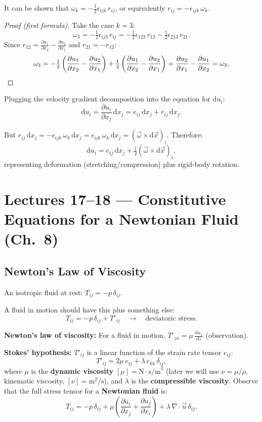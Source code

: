 \documentclass[11pt,a4paper]{article}
\newcommand{\pdx}[2]{\frac{\partial #1}{\partial #2}}
\newcommand{\xv}{\vec{x}}
\newcommand{\uv}{\vec{u}}
\newcommand{\omv}{\vec{\omega}}
\begin{document}
It can be shown that $\omega_k = -\tfrac{1}{2}\epsilon_{ijk}\,r_{ij}$, or equivalently $r_{ij} = -\epsilon_{ijk}\,\omega_k$.

\begin{proof}[Proof (first formula)]
Take the case $k = 3$:
\[
    \omega_3 = -\tfrac{1}{2}\epsilon_{ij3}\,r_{ij} = -\tfrac{1}{2}\epsilon_{123}\,r_{12} - \tfrac{1}{2}\epsilon_{213}\,r_{21}.
\]
Since $r_{12} = \pdx{u_1}{x_2} - \pdx{u_2}{x_1}$ and $r_{21} = -r_{12}$:
\[
    \omega_3 = -\tfrac{1}{2}\left(\pdx{u_1}{x_2} - \pdx{u_2}{x_1}\right) + \tfrac{1}{2}\left(\pdx{u_1}{x_2} - \pdx{u_2}{x_1}\right) = \pdx{u_2}{x_1} - \pdx{u_1}{x_2} = \omega_3. \qedhere
\]
\end{proof}

Plugging the velocity gradient decomposition into the equation for $\mathrm{d}u_i$:
\[
    \mathrm{d}u_i = \pdx{u_i}{x_j}\,\mathrm{d}x_j = e_{ij}\,\mathrm{d}x_j + r_{ij}\,\mathrm{d}x_j.
\]

But $r_{ij}\,\mathrm{d}x_j = -\epsilon_{ijk}\,\omega_k\,\mathrm{d}x_j = \epsilon_{ijk}\,\omega_k\,\mathrm{d}x_j = (\omv \times \mathrm{d}\xv)_i$. Therefore:
\[
    \boxed{\mathrm{d}u_i = e_{ij}\,\mathrm{d}x_j + \tfrac{1}{2}(\omv \times \mathrm{d}\xv)_i,}
\]
representing deformation (stretching/compression) plus rigid-body rotation.

\section{Lectures 17--18 --- Constitutive Equations for a Newtonian Fluid (Ch.\ 8)}

\subsection{Newton's Law of Viscosity}

An isotropic fluid at rest: $T_{ij} = -p\,\delta_{ij}$.

A fluid in motion should have this plus something else:
\[
    T_{ij} = -p\,\delta_{ij} + T'_{ij} \quad \longrightarrow \quad \text{deviatoric stress.}
\]

\textbf{Newton's law of viscosity:} For a fluid in motion, $T'_{zx} = \mu\,\frac{\mathrm{d}u_x}{\mathrm{d}z}$ (observation).

\textbf{Stokes' hypothesis:} $T'_{ij}$ is a linear function of the strain rate tensor $e_{ij}$:
\[
    \boxed{T'_{ij} = 2\mu\,e_{ij} + \lambda\,e_{kk}\,\delta_{ij},}
    \tag{1}
\]
where $\mu$ is the \textbf{dynamic viscosity} $[\mu] = \text{N}\cdot\text{s/m}^2$ (later we will use $\nu = \mu/\rho$, kinematic viscosity, $[\nu] = \text{m}^2/\text{s}$), and $\lambda$ is the \textbf{compressible viscosity}. Observe that the full stress tensor for a \textbf{Newtonian fluid} is:
\[
    \boxed{T_{ij} = -p\,\delta_{ij} + \mu\left(\pdx{u_i}{x_j} + \pdx{u_j}{x_i}\right) + \lambda\,\nabla\cdot\uv\,\delta_{ij}.}
    \tag{2}
\]
\end{document}
